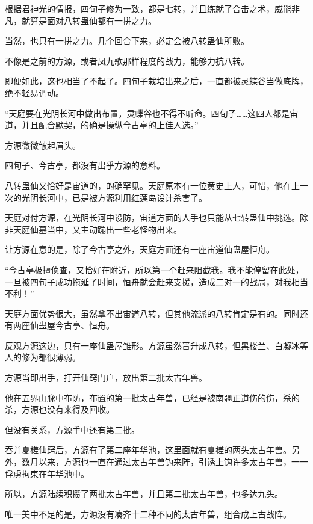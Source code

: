 
\begin{this_body}

根据君神光的情报，四旬子修为一致，都是七转，并且练就了合击之术，威能非凡，就算是面对八转蛊仙都有一拼之力。

当然，也只有一拼之力。几个回合下来，必定会被八转蛊仙所败。

不像是之前的方源，或者凤九歌那样程度的战力，能够力抗八转。

即便如此，这也相当了不起了。四旬子栽培出来之后，一直都被灵蝶谷当做底牌，绝不轻易调动。

“天庭要在光阴长河中做出布置，灵蝶谷也不得不听命。四旬子……这四人都是宙道，并且配合默契，的确是操纵今古亭的上佳人选。”

方源微微皱起眉头。

四旬子、今古亭，都没有出乎方源的意料。

八转蛊仙又恰好是宙道的，的确罕见。天庭原本有一位黄史上人，可惜，他在上一次的光阴长河中，已是被方源利用红莲岛设计杀害了。

天庭对付方源，在光阴长河中设防，宙道方面的人手也只能从七转蛊仙中挑选。除非天庭仙墓当中，又主动蹦出一些老怪物出来。

让方源在意的是，除了今古亭之外，天庭方面还有一座宙道仙蛊屋恒舟。

“今古亭极擅侦查，又恰好在附近，所以第一个赶来阻截我。我不能停留在此处，一旦被四旬子成功拖延了时间，恒舟就会赶来支援，造成二对一的战局，对我相当不利！”

天庭方面优势很大，虽然拿不出宙道八转，但其他流派的八转肯定是有的。同时还有两座仙蛊屋今古亭、恒舟。

反观方源这边，只有一座仙蛊屋雏形。方源虽然晋升成八转，但黑楼兰、白凝冰等人的修为都很薄弱。

方源当即出手，打开仙窍门户，放出第二批太古年兽。

他在五界山脉中布防，布置的第一批太古年兽，已经是被南疆正道伤的伤，杀的杀，方源也没有来得及回收。

但没有关系，方源手中还有第二批。

吞并夏槎仙窍后，方源有了第二座年华池，这里面就有夏槎的两头太古年兽。另外，数月以来，方源也一直在通过太古年兽钓来阵，引诱上钩许多太古年兽，一一俘虏拘束在年华池中。

所以，方源陆续积攒了两批太古年兽，并且第二批太古年兽，也多达九头。

唯一美中不足的是，方源没有凑齐十二种不同的太古年兽，组合成上古战阵。


\end{this_body}
